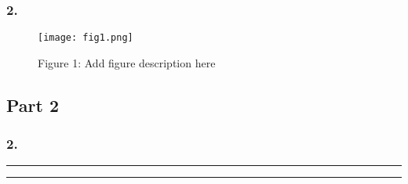 \documentclass{article}
\begin{document}
\subsubsection*{2.}


\begin{figure}[h!]
\centering
\texttt{[image: fig1.png]}

\caption{Figure 1: Add figure description here}
\label{fig1}
\end{figure}





\vspace{0.25in}

\subsection*{Part 2}

\subsubsection*{2.}



\hrule
\hrule



\end{document}
